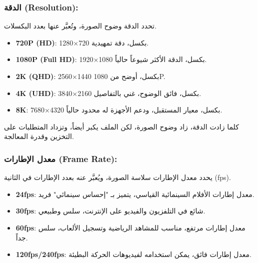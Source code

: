 


\subsubsection*{الدقة (Resolution):}

تحدد الدقة وضوح الصورة، وتُعبَّر عنها بعدد البكسلات.

\begin{itemize}
  \item \textbf{720P (HD)}: 1280×720 بكسل، دقة تمهيدية.
  \item \textbf{1080P (Full HD)}: 1920×1080 بكسل، الدقة الأكثر شيوعاً حالياً.
  \item \textbf{2K (QHD)}: 2560×1440 بكسل، أوضح من 1080P.
  \item \textbf{4K (UHD)}: 3840×2160 بكسل، فائق الوضوح، غني بالتفاصيل.
  \item \textbf{8K}: 7680×4320 بكسل، معيار المستقبل، ودعم الأجهزة له محدود حالياً.
\end{itemize}

كلما زادت الدقة، زاد وضوح الصورة، لكن الملف يكبر أيضاً، وتزداد المتطلبات على التخزين وقدرة المعالجة.

\subsubsection*{معدل الإطارات (Frame Rate):}

يحدد معدل الإطارات سلاسة الصورة، ويُعبَّر عنه بعدد الإطارات في الثانية (fps).

\begin{itemize}
  \item \textbf{24fps}: معدل إطارات الأفلام السينمائية القياسي، يتميز بـ "إحساس سينمائي" فريد.
  \item \textbf{30fps}: شائع في التلفزيون والفيديو على الإنترنت، سلس وطبيعي.
  \item \textbf{60fps}: معدل إطارات مرتفع، مناسب للمشاهد الرياضية وتسجيل الألعاب، سلس جداً.
  \item \textbf{120fps/240fps}: معدل إطارات فائق، يمكن استخدامه لفيديوهات الحركة البطيئة.
\end{itemize}

